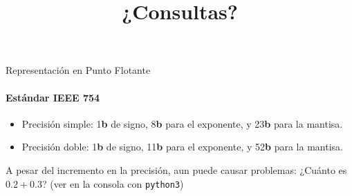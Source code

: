 \documentclass[11pt,a4paper,spanish]{beamer}
\newcommand{\bit}{\textbf{b}}
\begin{document}
\begin{frame}{Representación en Punto Flotante}
\framesubtitle{Estándar IEEE 754}
\begin{itemize}
    \item Precisión simple: 1\bit{} de signo, 8\bit{} para el exponente, y
        23\bit{} para la mantisa.
    \item Precisión doble: 1\bit{} de signo, 11\bit{} para el exponente, y
        52\bit{} para la mantisa.
\end{itemize} \pause

A pesar del incremento en la precisión, aun puede causar problemas: ¿Cuánto
    es $0.2 + 0.3$? (ver en la consola con \texttt{python3})

\end{frame}


\begin{frame}
    \title{¿Consultas?}
    \maketitle
\end{frame}

\setcounter{lastPage}{\number\value{page}}

\setcounter{page}{\number\value{lastPage}}
\end{document}
